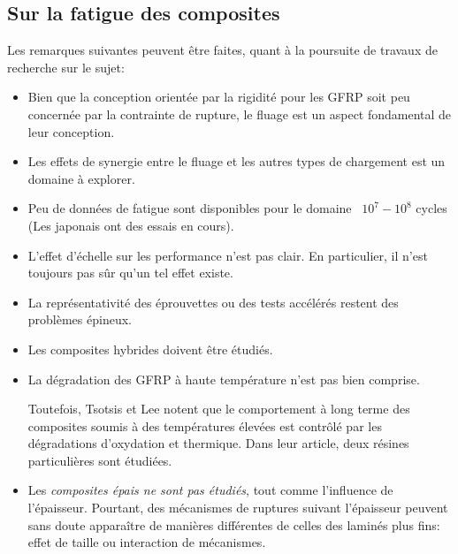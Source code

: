 \medskip
\subsection{Sur la fatigue des composites}
Les remarques suivantes peuvent être faites, quant à la poursuite de travaux de recherche sur le sujet:
\begin{itemize}
  \item Bien que la conception orientée par la rigidité pour les GFRP
     soit peu concernée par la contrainte de rupture, le fluage
     est un aspect fondamental de leur conception.
  \item Les effets de synergie entre le fluage et les autres types
     de chargement est un domaine à explorer.
  \item Peu de données de fatigue sont disponibles pour le domaine
    ~$10^7-10^8$ cycles (Les japonais ont des essais en cours).
  \item L'effet d'échelle sur les performance n'est pas clair.
     En particulier, il n'est toujours pas sûr qu'un tel effet
     existe.
  \item La représentativité des éprouvettes ou des tests accélérés
     restent des problèmes épineux.
  \item Les composites hybrides doivent être étudiés.
  \item La dégradation des GFRP à haute température n'est pas
     bien comprise.

     Toutefois, Tsotsis et
	 Lee notent que le
     comportement à long terme des composites soumis à des
     températures élevées
     est contrôlé par les dégradations d'oxydation et thermique.
     Dans leur article, deux résines particulières sont étudiées.

  \item Les {\em composites épais ne sont pas étudiés}, tout comme
     l'influence de l'épaisseur.
     Pourtant, des mécanismes de ruptures suivant l'épaisseur peuvent
     sans doute apparaître de manières différentes de celles des
     laminés plus fins: effet de taille ou interaction de mécanismes.
\end{itemize}
